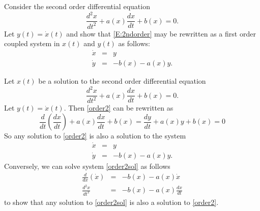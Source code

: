\documentclass{ximera}
\begin{document}
\begin{exercise} \label{c3.5.5}
Consider the second order differential equation
\begin{equation}  \label{E:2ndorder}
\frac{d^2x}{dt^2} + a(x)\frac{dx}{dt} + b(x) = 0.
\end{equation}
Let $y(t)=\dot{x}(t)$ and show that \eqref{E:2ndorder} may be
rewritten as a first order coupled system in $x(t)$ and $y(t)$
as follows:
\begin{eqnarray*}
\dot{x} & = & y \\
\dot{y} & = & -b(x) - a(x) y.
\end{eqnarray*}

\begin{solution}

Let $x(t)$ be a solution to the second order differential equation
\begin{equation} \label{order2}
\frac{d^2x}{dt^2} + a(x)\frac{dx}{dt} + b(x) = 0.
\end{equation}
Let $y(t) = \dot x(t)$.  Then \eqref{order2} can be rewritten as
\[ \frac{d}{dt}\left(\frac{dx}{dt}\right) + a(x)\frac{dx}{dt}
+ b(x) = \frac{dy}{dt} + a(x)y + b(x) = 0 \]
So any solution to \eqref{order2} is also a solution to the system
\begin{equation} \label{order2sol}
\begin{array}{rcl}
\dot{x} & = & y \\
\dot{y} & = & -b(x) - a(x) y.\end{array}
\end{equation}
Conversely, we can solve system \eqref{order2sol} as follows
\[ \begin{array}{rcl}
\frac{d}{dx}\left(\dot{x}\right) & = & -b(x) - a(x)\dot{x} \\
\frac{d^2x}{dt^2} & = & -b(x) - a(x)\frac{dx}{dt}\end{array}
\]
to show that any solution to \eqref{order2sol} is also a solution
to \eqref{order2}.

\end{solution}
\end{exercise}


\CEXER
\end{document}
